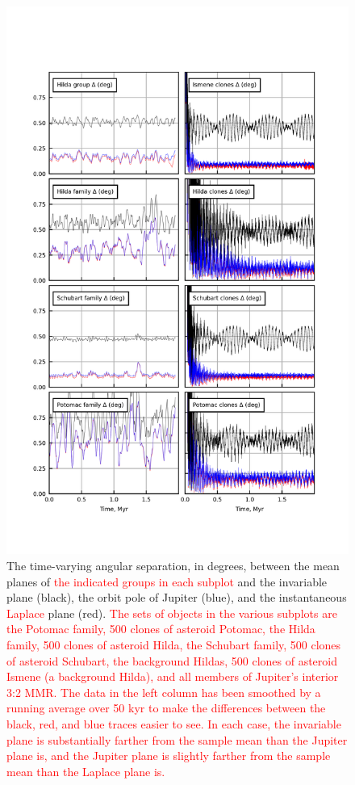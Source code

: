\documentclass[a4paper,fleqn]{cas-sc}
\begin{document}
\begin{linenumbers}
\begin{centering}
\begin{figure}
\includegraphics[width=4.5in]{figure5.png}
\caption{
The time-varying angular separation, in degrees, between the mean planes of \textcolor{red}{the indicated groups in each subplot} and the invariable plane (black), the orbit pole of Jupiter (blue), and the instantaneous \textcolor{red}{Laplace} plane (red). \textcolor{red}{The sets of objects in the various subplots are the Potomac family, 500 clones of asteroid Potomac, the Hilda family, 500 clones of asteroid Hilda, the Schubart family, 500 clones of asteroid Schubart, the background Hildas, 500 clones of asteroid Ismene (a background Hilda), and all members of Jupiter's interior 3:2 MMR. The data in the left column has been smoothed by a running average over 50 kyr to make the differences between the black, red, and blue traces easier to see.
In each case, the invariable plane is substantially farther from the sample mean than the Jupiter plane is, and the Jupiter plane is slightly farther from the sample mean than the Laplace plane is.}
}
\label{fig:fig_prm_plots}
\end{figure}
\end{centering}


\end{linenumbers}
\end{document}
